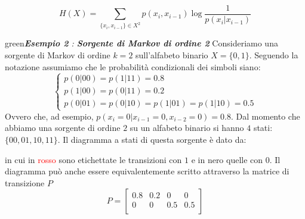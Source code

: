 \begin{equation}
\label{eqn:markov}
    H(X) = \sum_{ \{x_i, x_{i-1}\} \in X^2} p(x_i, x_{i-1}) \log \frac{1}{p(x_i | x_{i-1})}
\end{equation}
\begin{mybox}[breakable]{green}{\textit{\textbf{Esempio 2} : \textbf{Sorgente di Markov di ordine 2}}}
Consideriamo una sorgente di Markov di ordine $k=2$ sull'alfabeto binario $X=\{0,1\}$. Seguendo la notazione assumiamo che le probabilit\`a condizionali dei simboli siano:
\begin{equation*}
\begin{cases}
    p(0|00) = p(1|11) = 0.8 \\
    p(1|00) = p(0|11) = 0.2 \\
    p(0|01) = p(0|10) = p(1|01) = p(1|10) = 0.5
\end{cases}
\end{equation*}
Ovvero che, ad esempio, $p(x_i=0|x_{i-1}=0, x_{i-2}=0) = 0.8$. Dal momento che abbiamo una sorgente di ordine $2$ su un alfabeto binario si hanno $4$ stati: $\{00, 01, 10, 11\}$. Il diagramma a stati di questa sorgente \`e dato da:
\begin{center}
\label{fig:markov2}
\end{center}
in cui in \textcolor{red}{rosso} sono etichettate le transizioni con $1$ e in nero quelle con $0$. Il diagramma pu\`o anche essere equivalentemente scritto attraverso la matrice di transizione $P$
\begin{equation*}
    P = \begin{bmatrix}
    0.8 & 0.2 & 0 & 0 \\
    0 & 0 & 0.5 & 0.5 \\

\end{bmatrix}
\end{equation*}
\end{mybox}
